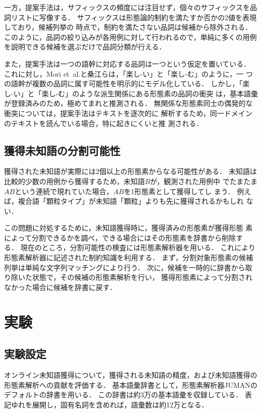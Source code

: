 \documentclass[japanese]{jnlp_1.4}
\begin{document}
一方，提案手法は，サフィックスの頻度には注目せず，個々のサフィックスを品
詞リストに写像する．
サフィックスは形態論的制約を満たすか否かの2値を表現しており，候補列挙の
時点で，制約を満たさない品詞は候補から除外される．
このように，品詞の絞り込みが各用例に対して行われるので，単純に多くの用例
を説明できる候補を選ぶだけで品詞分類が行える．

また，提案手法は一つの語幹に対応する品詞は一つという仮定を置いている．
これに対し，Mori et~al.と桑江らは，「楽し-い」と「楽し-む」のように，一
つの語幹が複数の品詞に属す可能性を明示的にモデル化している．
しかし，「楽し-い」と「楽し-む」のような派生関係にある形態素の品詞の衝突
は，基本語彙が登録済みのため，極めてまれと推測される．
無関係な形態素同士の偶発的な衝突については，提案手法はテキストを逐次的に
解析するため，同一ドメインのテキストを読んでいる場合，特に起きにくいと推
測される．



\subsection{獲得未知語の分割可能性} \label{sec:selection-decomposition}

獲得された未知語が実際には2個以上の形態素からなる可能性がある．
未知語は比較的少数の用例から獲得するため，未知語$B$が，観測された用例中
でたまたま$AB$という連続で現れていた場合，$AB$を1形態素として獲得してし
まう．
例えば，複合語「顆粒タイプ」が未知語「顆粒」よりも先に獲得されるかもしれ
ない．

この問題に対処するために，未知語獲得時に，獲得済みの形態素が獲得形態
素によって分割できるかを調べ，できる場合にはその形態素を辞書から削除す
る．
現在のところ，分割可能性の検査には形態素解析器を用いる．
これにより形態素解析器に記述された制約知識を利用する．
まず，分割対象形態素の候補列挙は単純な文字列マッチングにより行う．
次に，候補を一時的に辞書から取り除いた状態で，その候補の形態素解析を行い，
獲得形態素によって分割されなかった場合に候補を辞書に戻す．




\section{実験} \label{sec:experiments}

\subsection{実験設定} \label{sec:experiments-settings}

オンライン未知語獲得について，獲得される未知語の精度，および未知語獲得の
形態素解析への貢献を評価する．
基本語彙辞書として，形態素解析器JUMANのデフォルトの辞書を用いる．
この辞書は約3万の基本語彙を収録している．
表記ゆれを展開し，固有名詞を含めれば，語彙数は約12万となる．
\end{document}
